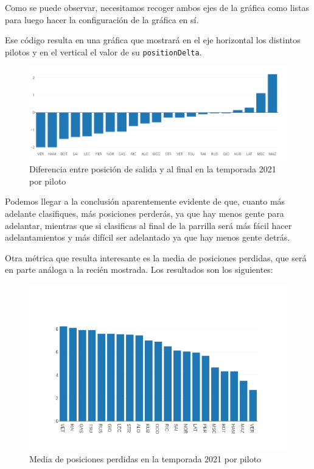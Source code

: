 \documentclass[12pt,twoside,titlepage]{report}
\begin{document}
Como se puede observar, necesitamos recoger ambos ejes de la gráfica como listas para luego hacer la configuración de la gráfica en sí.

Ese código resulta en una gráfica que mostrará en el eje horizontal los distintos pilotos y en el vertical el valor de su \texttt{positionDelta}.

\begin{figure}[H]
	\includegraphics[scale=0.4]{results/seasonanalysis/positionDelta.png}
	\centering
	\caption{Diferencia entre posición de salida y al final en la temporada 2021 por piloto}
	\label{fig:positionDelta}
	\centering
\end{figure}

Podemos llegar a la conclusión aparentemente evidente de que, cuanto más adelante clasifiques, más posiciones perderás, ya que hay menos gente para adelantar, mientras que si clasificas al final de la parrilla será más fácil hacer adelantamientos y más difícil ser adelantado ya que hay menos gente detrás.

Otra métrica que resulta interesante es la media de posiciones perdidas, que será en parte análoga a la recién mostrada. Los resultados son los siguientes:

\begin{figure}[H]
	\includegraphics[scale=0.4]{results/seasonanalysis/avgpositionslost2021.png}
	\centering
	\caption{Media de posiciones perdidas en la temporada 2021 por piloto}
	\label{fig:avgPosLost2021}
	\centering
\end{figure}
\end{document}
